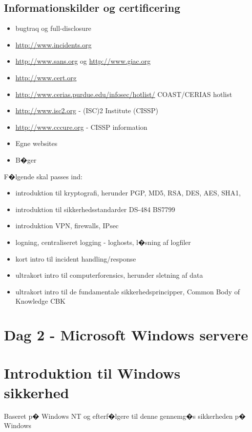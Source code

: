 \documentclass[a4paper,12pt]{article}
\newcommand{\link}[1]{\href{#1}{#1}}
\begin{document}
\subsection{Informationskilder og certificering}
\begin{itemize}
\item bugtraq og full-disclosure
\item \link{http://www.incidents.org}
\item \link{http://www.sans.org} og \link{http://www.giac.org}
\item \link{http://www.cert.org}
\item \link{http://www.cerias.purdue.edu/infosec/hotlist/}
  COAST/CERIAS hotlist
\item \link{http://www.isc2.org} - (ISC)2 Institute (CISSP)
\item \link{http://www.cccure.org} - CISSP information
\item Egne websites
\item B�ger
\end{itemize}


F�lgende skal passes ind:
\begin{itemize}
\item introduktion til kryptografi, herunder PGP, MD5, RSA, DES, AES, SHA1,
\item introduktion til sikkerhedsstandarder DS-484 BS7799
\item introduktion VPN, firewalls, IPsec
\item logning, centraliseret logging - loghosts, l�sning af logfiler
\item kort intro til incident handling/response
\item ultrakort intro til computerforensics, herunder sletning af data
\item ultrakort intro til de fundamentale sikkerhedsprincipper, Common
  Body of Knowledge CBK
\end{itemize}

\section{Dag 2 - Microsoft Windows servere}

\section{Introduktion til Windows sikkerhed}

Baseret p� Windows NT og efterf�lgere til denne gennemg�s sikkerheden
p� Windows
\end{document}
